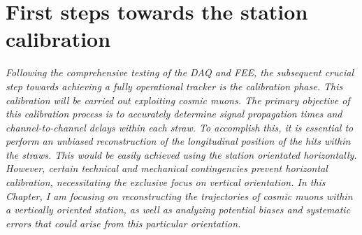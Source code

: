 \chapter{First steps towards the station calibration}\label{planning}
\textit{Following the comprehensive testing of the DAQ and FEE, the subsequent crucial 
step towards achieving a fully operational tracker is the calibration phase. This 
calibration will be carried out exploiting cosmic muons. The primary objective of 
this calibration process is to accurately determine signal propagation times and 
channel-to-channel delays within each straw. To accomplish this, it is essential 
to perform an unbiased reconstruction of the longitudinal position of the hits 
within the straws. This would be easily achieved using the station orientated horizontally. 
However, certain technical and mechanical contingencies prevent horizontal calibration, 
necessitating the exclusive focus on vertical orientation.
In this Chapter, I am focusing on 
reconstructing the trajectories of cosmic muons within a vertically oriented 
station, as well as analyzing potential biases and systematic errors that could 
arise from this particular orientation.}
